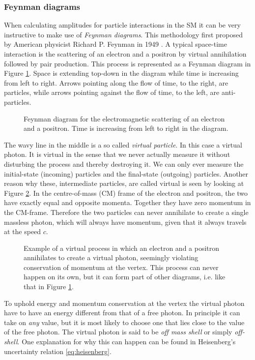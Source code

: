\subsubsection{Feynman diagrams}
When calculating amplitudes for particle interactions in the SM it can be very instructive to make use of \emph{Feynman diagrams}. This methodology first proposed by American physicist Richard P. Feynman in 1949 \cite{feynman1949sta}. A typical space-time interaction is the scattering of an electron and a positron by virtual annihilation followed by pair production. This process is represented as a Feynman diagram in Figure \ref{fig:feyn:ee_a_ee}. Space is extending top-down in the diagram while time is increasing from left to right. Arrows pointing along the flow of time, to the right, are particles, while arrows pointing against the flow of time, to the left, are anti-particles.
\begin{figure}[htp]
\centering
	
\caption{Feynman diagram for the electromagnetic scattering of an electron and a positron. Time is increasing from left to right in the diagram.} \label{fig:feyn:ee_a_ee}
\end{figure}
The wavy line in the middle is a so called \emph{virtual particle}. In this case a virtual photon. It is virtual in the sense that we never actually measure it without disturbing the process and thereby destroying it. We can only ever measure the initial-state (incoming) particles and the final-state (outgoing) particles. Another reason why these, intermediate particles, are called virtual is seen by looking at Figure \ref{fig:feyn:ee_a}. In the centre-of-mass (CM) frame of the electron and positron, the two have exactly equal and opposite momenta. Together they have zero momentum in the CM-frame. Therefore the two particles can never annihilate to create a single massless photon, which will always have momentum, given that it always travels at the speed $c$. \cite{griffiths1987iep}
\begin{figure}[htp]
\centering
	
\caption{Example of a virtual process in which an electron and a positron annihilates to create a virtual photon, seemingly violating conservation of momentum at the vertex. This process can never happen on its own, but it can form part of other diagrams, i.e. like that in Figure \ref{fig:feyn:ee_a_ee}.} \label{fig:feyn:ee_a}
\end{figure}
To uphold energy and momentum conservation at the vertex the virtual photon have to have an energy different from that of a free photon. In principle it can take on \emph{any} value, but it is most likely to choose one that lies close to the value of the free photon. The virtual photon is said to be \emph{off mass shell} or simply \emph{off-shell}. One explanation for why this can happen can be found in Heisenberg's uncertainty relation \eqref{eq:heisenberg}.

